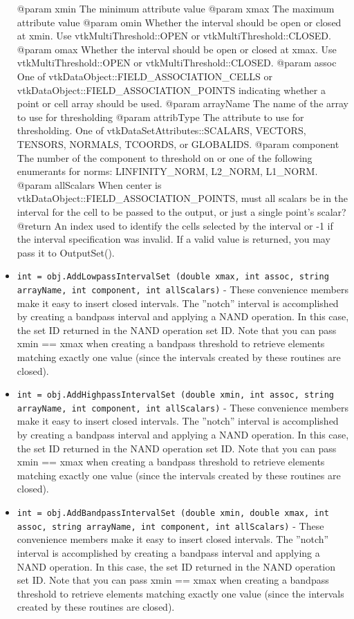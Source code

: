 \begin{itemize}
 @param xmin The minimum attribute value
 @param xmax The maximum attribute value
 @param omin Whether the interval should be open or closed at  xmin. Use vtkMultiThreshold::OPEN or vtkMultiThreshold::CLOSED.
 @param omax Whether the interval should be open or closed at  xmax. Use vtkMultiThreshold::OPEN or vtkMultiThreshold::CLOSED.
 @param assoc One of vtkDataObject::FIELD\_ASSOCIATION\_CELLS or vtkDataObject::FIELD\_ASSOCIATION\_POINTS indicating whether 
               a point or cell array should be used.
 @param arrayName The name of the array to use for thresholding
 @param attribType The attribute to use for thresholding.
                   One of vtkDataSetAttributes::SCALARS, VECTORS, TENSORS, NORMALS, TCOORDS, or GLOBALIDS.
 @param component The number of the component to threshold on or one of the following enumerants for norms:
                  LINFINITY\_NORM, L2\_NORM, L1\_NORM.
 @param allScalars When  center is vtkDataObject::FIELD\_ASSOCIATION\_POINTS, must all scalars be in the interval for
                   the cell to be passed to the output, or just a single point's scalar?
 @return An index used to identify the cells selected by the interval or -1 if the interval specification was invalid.
         If a valid value is returned, you may pass it to OutputSet().

\item  \verb|int = obj.AddLowpassIntervalSet (double xmax, int assoc, string arrayName, int component, int allScalars)| -  These convenience members make it easy to insert closed intervals.
 The ''notch'' interval is accomplished by creating a bandpass interval and applying a NAND operation.
 In this case, the set ID returned in the NAND operation set ID.
 Note that you can pass xmin == xmax when creating a bandpass threshold to retrieve elements matching exactly
 one value (since the intervals created by these routines are closed).

\item  \verb|int = obj.AddHighpassIntervalSet (double xmin, int assoc, string arrayName, int component, int allScalars)| -  These convenience members make it easy to insert closed intervals.
 The ''notch'' interval is accomplished by creating a bandpass interval and applying a NAND operation.
 In this case, the set ID returned in the NAND operation set ID.
 Note that you can pass xmin == xmax when creating a bandpass threshold to retrieve elements matching exactly
 one value (since the intervals created by these routines are closed).

\item  \verb|int = obj.AddBandpassIntervalSet (double xmin, double xmax, int assoc, string arrayName, int component, int allScalars)| -  These convenience members make it easy to insert closed intervals.
 The ''notch'' interval is accomplished by creating a bandpass interval and applying a NAND operation.
 In this case, the set ID returned in the NAND operation set ID.
 Note that you can pass xmin == xmax when creating a bandpass threshold to retrieve elements matching exactly
 one value (since the intervals created by these routines are closed).


\end{itemize}

